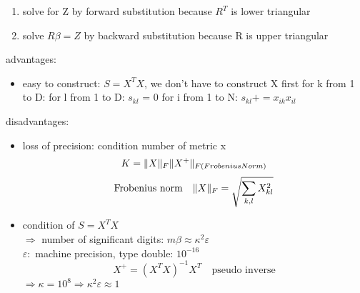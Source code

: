 \documentclass[11pt]{article}
\DeclarePairedDelimiter\norm{\lVert}{\rVert}
\begin{document}
\begin{itemize}
\begin{enumerate}
        \begin{enumerate}
          \item solve for Z by forward substitution because $R^T$ is lower triangular
          \item solve $R\beta=Z$ by backward substitution because R is upper triangular
        \end{enumerate}
        advantages:
        \begin{itemize}
          \item easy to construct: $S=X^TX$, we don't have to construct X first \newline
            for k from 1 to D: \newline
            \-\hspace{1cm}  for l from 1 to D: \newline
            \-\hspace{2cm}      $s_{kl}$ = 0 \newline
            \-\hspace{2cm}     for i from 1 to N: \newline
            \-\hspace{3cm}         $s_{kl} += x_{ik}x_{il}$ \newline
        \end{itemize}
        disadvantages:
        \begin{itemize}
          \item loss of precision: condition number of metric x
          \begin{equation*}
            K = \norm{X}_F\norm{X^+}_{F (Frobenius Norm)}
          \end{equation*}
          \begin{equation*}
            \text{Frobenius norm} \quad \norm{X}_F = \sqrt{\sum_{k,l} X_{kl}^2}
          \end{equation*}
          \item condition of $S = X^TX$ \\
          $\Rightarrow$ number of significant digits: $m\beta \approx \kappa^2\varepsilon$ \\
          $\varepsilon: $ machine precision, type double: $10^{-16}$ \\
          \begin{equation*}
            X^+ = (X^TX)^{-1}X^T \quad \text{pseudo inverse}
          \end{equation*}
          $\Rightarrow \kappa = 10^8 \Rightarrow \kappa^2\varepsilon \approx 1$
        \end{itemize}

\end{enumerate}
\end{itemize}
\end{document}
